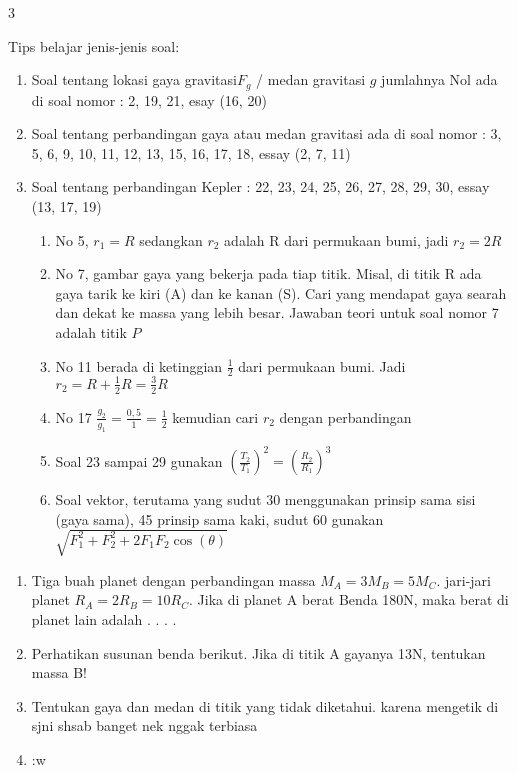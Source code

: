\documentclass[10pt,a4paper]{article}
\begin{document}
\begin{multicols*} {3}
\begin{enumerate}[itemsep=0mm,topsep=0mm]
\end{enumerate}
 Tips belajar jenis-jenis soal: 
\begin{enumerate}[label=\alph*.,topsep=0mm,itemsep=0mm]
\item Soal tentang lokasi gaya gravitasi$F_g$ / medan gravitasi $g$ jumlahnya Nol ada di soal nomor : 2, 19, 21, esay (16, 20)
\item Soal tentang perbandingan gaya atau medan gravitasi ada di soal nomor : 3, 5, 6, 9, 10, 11, 12, 13, 15, 16, 17, 18, essay (2, 7, 11)
\item Soal tentang perbandingan Kepler : 22, 23, 24, 25, 26, 27, 28, 29, 30, essay (13, 17, 19)
\begin{enumerate}[label=-,itemsep=0mm,topsep=0mm]
\item No 5, $r_1 = R$ sedangkan $r_2$ adalah R dari permukaan bumi, jadi $r_2 = 2R$
\item No 7, gambar gaya yang bekerja pada tiap titik. Misal, di titik R ada gaya tarik ke kiri (A) dan ke kanan (S). Cari yang mendapat gaya searah dan dekat ke massa yang lebih besar. Jawaban teori untuk soal nomor 7 adalah titik $P$
\item No 11 berada di ketinggian $\frac{1}{2}$ dari permukaan bumi. Jadi $r_2=R+\frac{1}{2}R=\frac{3}{2}R$
\item No 17 $\frac{g_2}{g_1}=\frac{0,5}{1}=\frac{1}{2}$ kemudian cari $r_2$ dengan perbandingan
\item Soal 23 sampai 29 gunakan $\left(\frac{T_2}{T_1}\right)^2=\left(\frac{R_2}{R_1}\right)^3$
\item Soal vektor, terutama yang sudut 30 menggunakan prinsip sama sisi (gaya sama), 45 prinsip sama kaki, sudut 60 gunakan $\sqrt{F_1^2+F_2^2+2F_1F_2\cos(\theta)}$


\end{enumerate}
\end{enumerate}


\end{multicols*}
\newpage
\vspace{1.5cm}

\begin{multicols*}{3}
	\begin{enumerate}

	\item Tiga buah planet dengan perbandingan massa $M_A=3M_B=5M_C$. jari-jari planet $R_A=2R_B=10R_C$. Jika di planet A berat Benda 180N, maka berat di planet lain adalah . . . .

	\item Perhatikan susunan benda berikut. Jika di titik A gayanya 13N, tentukan massa B!


	
        \item Tentukan gaya dan medan di titik yang tidak diketahui. karena mengetik di sjni shsab banget nek nggak terbiasa
        \item :w


	\end{enumerate}


\end{multicols*}

 
\end{document}
